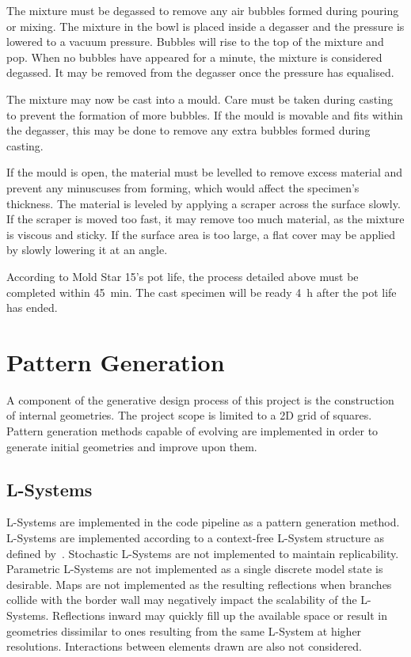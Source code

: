 The mixture must be degassed to remove any air bubbles formed during pouring or mixing. The mixture in the bowl is placed inside a degasser and the pressure is lowered to a vacuum pressure. Bubbles will rise to the top of the mixture and pop. When no bubbles have appeared for a minute, the mixture is considered degassed. It may be removed from the degasser once the pressure has equalised.

The mixture may now be cast into a mould. Care must be taken during casting to prevent the formation of more bubbles. If the mould is movable and fits within the degasser, this may be done to remove any extra bubbles formed during casting.

If the mould is open, the material must be levelled to remove excess material and prevent any minuscuses from forming, which would affect the specimen's thickness. The material is leveled by applying a scraper across the surface slowly. If the scraper is moved too fast, it may remove too much material, as the mixture is viscous and sticky. If the surface area is too large, a flat cover may be applied by slowly lowering it at an angle.

According to Mold Star 15's pot life, the process detailed above must be completed within \SI{45}{\minute}. The cast specimen will be ready \SI{4}{\hour} after the pot life has ended.

\section{Pattern Generation}

A component of the generative design process of this project is the construction of internal geometries. The project scope is limited to a 2D grid of squares. Pattern generation methods capable of evolving are implemented in order to generate initial geometries and improve upon them.

\subsection{L-Systems}
\label{ssec:LS}

L-Systems are implemented in the code pipeline as a pattern generation method. L-Systems are implemented according to a context-free L-System structure as defined by~\cite{Prusinkiewicz2004}. Stochastic L-Systems are not implemented to maintain replicability. Parametric L-Systems are not implemented as a single discrete model state is desirable. Maps are not implemented as the resulting reflections when branches collide with the border wall may negatively impact the scalability of the L-Systems. Reflections inward may quickly fill up the available space or result in geometries dissimilar to ones resulting from the same L-System at higher resolutions. Interactions between elements drawn are also not considered.

